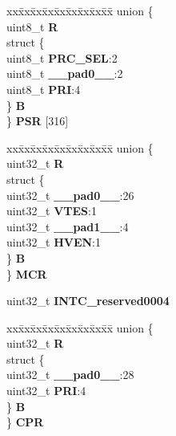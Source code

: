\begin{DoxyCompactItemize}
\begin{tabbing}
\end{tabbing}\item 
\mbox{\label{structINTC__tag_af9a4118988bf4bb5914654c799faed1c}} 
\begin{tabbing}
xx\=xx\=xx\=xx\=xx\=xx\=xx\=xx\=xx\=\kill
union \{\\
\>uint8\_t {\bfseries R}\\
\>struct \{\\
\>\>uint8\_t {\bfseries PRC\_SEL}:2\\
\>\>uint8\_t {\bfseries \_\_pad0\_\_}:2\\
\>\>uint8\_t {\bfseries PRI}:4\\
\>\} {\bfseries B}\\
\} {\bfseries PSR} \mbox{[}316\mbox{]}\\

\end{tabbing}\item 
\mbox{\label{structINTC__tag_a45d57df0c6ff8199e340bcd57c3b6200}} 
\begin{tabbing}
xx\=xx\=xx\=xx\=xx\=xx\=xx\=xx\=xx\=\kill
union \{\\
\>uint32\_t {\bfseries R}\\
\>struct \{\\
\>\>uint32\_t {\bfseries \_\_pad0\_\_}:26\\
\>\>uint32\_t {\bfseries VTES}:1\\
\>\>uint32\_t {\bfseries \_\_pad1\_\_}:4\\
\>\>uint32\_t {\bfseries HVEN}:1\\
\>\} {\bfseries B}\\
\} {\bfseries MCR}\\

\end{tabbing}\item 
\mbox{\label{structINTC__tag_aaa7b23a96a9dc279162f1f108f21a3ff}} 
uint32\+\_\+t {\bfseries I\+N\+T\+C\+\_\+reserved0004}
\item 
\mbox{\label{structINTC__tag_a22c86b1b3f39f2023df4da4f1252eae2}} 
\begin{tabbing}
xx\=xx\=xx\=xx\=xx\=xx\=xx\=xx\=xx\=\kill
union \{\\
\>uint32\_t {\bfseries R}\\
\>struct \{\\
\>\>uint32\_t {\bfseries \_\_pad0\_\_}:28\\
\>\>uint32\_t {\bfseries PRI}:4\\
\>\} {\bfseries B}\\
\} {\bfseries CPR}\\


\end{tabbing}
\end{DoxyCompactItemize}
